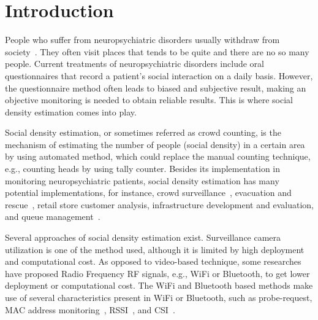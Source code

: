 \chapter{Introduction}\label{ch:introduction}

People who suffer from neuropsychiatric disorders usually withdraw from society~\cite{thesis084,thesis083}. They often visit places that tends to be quite and there are no so many people. Current treatments of neuropsychiatric disorders include oral questionnaires that record a patient's social interaction on a daily basis. However, the questionnaire method often leads to biased and subjective result, making an objective monitoring is needed to obtain reliable results.
This is where social density estimation comes into play.

Social density estimation, or sometimes referred as crowd counting, is the mechanism of estimating the number of people (social density) in a certain area by using automated method, which could replace the manual counting technique, e.g., counting heads by using tally counter. Besides its implementation in monitoring neuropsychiatric patients, social density estimation has many potential implementations, for instance, crowd surveillance~\cite{thesis050}, evacuation and rescue~\cite{thesis045}, retail store customer analysis, infrastructure development and evaluation, and queue management~\cite{thesis012}.

Several approaches of social density estimation exist. Surveillance camera utilization is one of the method used, although it is limited by high deployment and computational cost. As opposed to video-based technique, some researches have proposed Radio Frequency RF signals, e.g., WiFi or Bluetooth, to get lower deployment or computational cost. The WiFi and Bluetooth based methods make use of several characteristics present in WiFi or Bluetooth, such as probe-request, MAC address monitoring~\cite{thesis008}, \ac{RSSI}~\cite{thesis046}, and \ac{CSI}~\cite{thesis051}.

